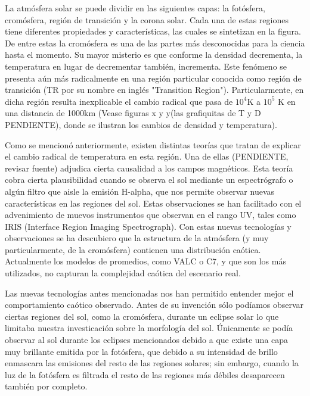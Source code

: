 \documentclass[9pt]{book}
\begin{document}
La atm\'osfera solar se puede dividir en las siguientes capas: la fot\'osfera, crom\'osfera, regi\'on de transici\'on y la corona solar. Cada una de estas regiones tiene diferentes propiedades y caracter\'isticas, las cuales se sintetizan en la figura. %
De entre estas la crom\'osfera es una de las partes m\'as desconocidas para la ciencia hasta el momento. Su mayor misterio es que conforme la densidad decrementa, la temperatura en lugar de decrementar tambi\'en, incrementa. Este fen\'omeno se presenta a\'un m\'as radicalmente en una regi\'on particular conocida como regi\'on de transici\'on (TR por su nombre en ingl\'es "Transition Region"). Particularmente, en dicha regi\'on resulta inexplicable el cambio radical que pasa de $10^4$K a $10^5$ K en una distancia de 1000km (Vease figuras x y y(las grafiquitas de T y D PENDIENTE), donde se ilustran los cambios de densidad y temperatura).

Como se mencion\'o anteriormente, existen distintas teor\'ias que tratan de explicar el cambio radical de temperatura en esta regi\'on. Una de ellas (PENDIENTE, revisar fuente) adjudica cierta causalidad a los campos magn\'eticos. Esta teor\'ia cobra cierta plausibilidad cuando se observa el sol mediante un espectr\'ografo o alg\'un filtro que aisle la emisi\'on H-alpha, que nos permite observar nuevas caracter\'isticas en las regiones del sol. Estas observaciones se han facilitado con el advenimiento de muevos instrumentos que observan en el rango UV, tales como IRIS (Interface Region Imaging Spectrograph). Con estas nuevas tecnolog\'ias y observaciones se ha descubiero que la estructura de la atm\'osfera (y muy particularmente, de la crom\'osfera) contienen una distribuci\'on ca\'otica. Actualmente los modelos de promedios, como VALC o C7, y que son los m\'as utilizados, no capturan la complejidad ca\'otica del escenario real.

Las nuevas tecnolog\'ias antes mencionadas nos han permitido entender mejor el comportamiento ca\'otico observado. Antes de su invenci\'on s\'olo pod\'iamos observar ciertas regiones del sol, como la crom\'osfera, durante un eclipse solar lo que limitaba nuestra investicaci\'on sobre la morfolog\'ia del sol. \'Unicamente se pod\'ia observar al sol durante los eclipses mencionados debido a que existe una capa muy brillante emitida por la fot\'osfera, que debido a su intensidad de brillo enmascara las emisiones del resto de las regiones solares; sin embargo, cuando la luz de la fot\'osfera es filtrada el resto de las regiones m\'as d\'ebiles desaparecen tambi\'en por completo.
\end{document}
